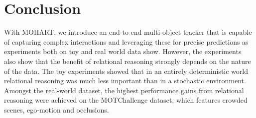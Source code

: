 \section{Conclusion}
\label{sec:discussion}

With MOHART, we introduce an end-to-end multi-object tracker that is capable of capturing complex interactions and leveraging these for precise predictions as experiments both on toy and real world data show. However, the experiments also show that the benefit of relational reasoning strongly depends on the nature of the data. The toy experiments showed that in an entirely deterministic world relational reasoning was much less important than in a stochastic environment. Amongst the real-world dataset, the highest performance gains from relational reasoning were achieved on the MOTChallenge dataset, which features crowded scenes, ego-motion and occlusions.
